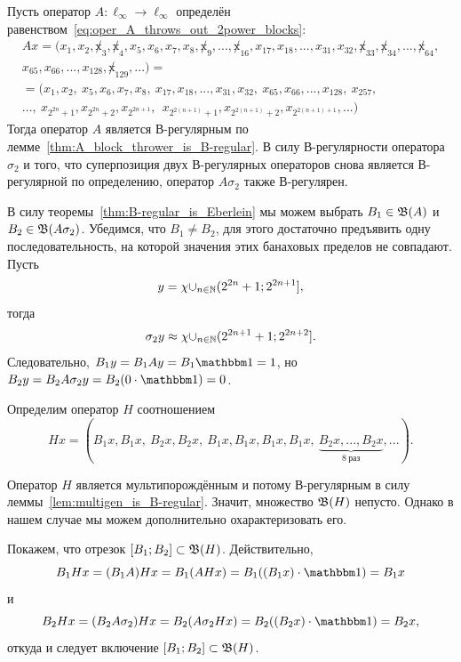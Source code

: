 \begin{example}
	\label{ex:multigen_invariant_interval}
	Пусть оператор $A:\ell_\infty\to\ell_\infty$
	определён равенством~\eqref{eq:oper_A_throws_out_2power_blocks}:
	\begin{multline}
		Ax = (x_1, x_2, \not x_3, \not x_4, x_5, x_6, x_7, x_8, \not x_9, ..., \not x_{16}, x_{17}, x_{18}, ..., x_{31}, x_{32}, \not x_{33}, \not x_{34}, ..., \not x_{64},
		\\
		x_{65}, x_{66}, ..., x_{128}, \not x_{129}, ...)=
		\\=
		(x_1, x_2, \ x_5, x_6, x_7, x_8, \ x_{17}, x_{18}, ..., x_{31}, x_{32}, \ x_{65}, x_{66}, ..., x_{128}, \ x_{257},
		\\
		..., \ x_{2^{2n} +1}, x_{2^{2n} +2},  x_{2^{2n+1}}, \ \ x_{2^{2(n+1)} +1},  x_{2^{2(n+1)} +2},  x_{2^{2(n+1)+1}}, ...)
	\end{multline}
	Тогда оператор $A$ является В-регулярным по лемме~\ref{thm:A_block_thrower_is_B-regular}.
	В силу В-регулярности оператора $\sigma_2$ и того,
	что суперпозиция двух В-регулярных операторов снова является В-регулярной по определению,
	оператор $A\sigma_2$ также В-регулярен.

	В силу теоремы~\ref{thm:B-regular_is_Eberlein} мы можем выбрать $B_1 \in \mathfrak{B} (A)$ и $B_2 \in \mathfrak{B}(A\sigma_2)$.
	Убедимся, что $B_1 \ne B_2$, для этого достаточно предъявить одну последовательность, на которой
	значения этих банаховых пределов не совпадают.
	Пусть
	\begin{equation}
		y = \chi {\cup_{n\in\ensuremath{\mathbb{N}}}(2^{2n}+1; 2^{2n+1}]}
		,
	\end{equation}
	тогда
	\begin{equation}
		\sigma_2 y \approx \chi {\cup_{n\in\ensuremath{\mathbb{N}}}(2^{2n+1}+1; 2^{2n+2}]}
		.
	\end{equation}
	Следовательно, $B_1y = B_1Ay = B_1\one = 1$, но $B_2y = B_2A\sigma_2 y = B_2(0\cdot \one) = 0$.

	Определим оператор $H$ соотношением
	\begin{equation}
		Hx = (B_1 x, B_1 x, \ B_2 x, B_2 x, \ B_1 x, B_1 x, B_1 x, B_1 x, \ \underbrace{B_2 x, ..., B_2 x}_{8~\mbox{раз}}, ...)
		.
	\end{equation}

	Оператор $H$ является мультипорождённым и потому В-регулярным в силу леммы~\ref{lem:multigen_is_B-regular}.
	Значит, множество $\mathfrak{B}(H)$ непусто.
	Однако в нашем случае мы можем дополнительно охарактеризовать его.

	Покажем, что отрезок $[B_1; B_2]\subset \mathfrak{B}(H)$.
	Действительно,
	\begin{equation}
		B_1 Hx  = (B_1 A) Hx = B_1 (AHx)  = B_1 ((B_1 x) \cdot \one) = B_1 x
	\end{equation}
	и
	\begin{equation}
		B_2 Hx  = (B_2 A\sigma_2) Hx = B_2 (A\sigma_2 Hx)  = B_2 ((B_2 x) \cdot \one) = B_2 x
		,
	\end{equation}
	откуда и следует включение $[B_1; B_2]\subset \mathfrak{B}(H)$.
\end{example}


